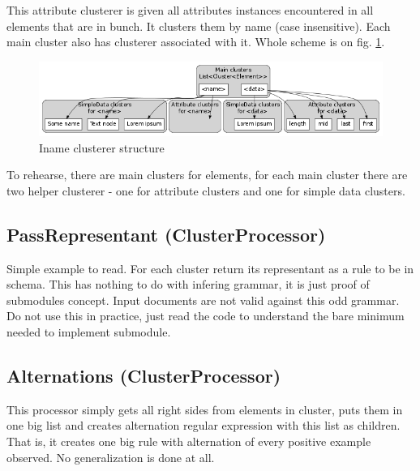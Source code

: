 \documentclass[a4paper,10pt,oneside]{article}
\newcommand{\code}[1]{\texttt{\StrSubstitute{#1}{.}{.\.}}}
\def\.{\discretionary{}{}{}}
\begin{document}
This attribute clusterer is given all attributes instances encountered in all elements that are in bunch.
It clusters them by name (case insensitive).
Each main cluster also has \code{SimpleData} clusterer associated with it.
Whole scheme is on fig. \ref{clusterer_structure}.
\begin{figure}[tpb]
	\centering\includegraphics[scale=1]{clusterer_structure}
	\caption{Iname clusterer structure} \label{clusterer_structure}
\end{figure}

To rehearse, there are main clusters for elements, for each main cluster there are two helper clusterer - one for attribute clusters and one for simple data clusters.

\subsection{PassRepresentant (ClusterProcessor)} \label{section_PassRepresentant}
Simple example to read. For each cluster return its representant as a rule to be in schema.
This has nothing to do with infering grammar, it is just proof of submodules concept.
Input documents are not valid against this odd grammar.
Do not use this in practice, just read the code to understand the bare minimum needed to implement submodule.

\subsection{Alternations (ClusterProcessor)} \label{section_Alternations}
This processor simply gets all right sides from elements in cluster, puts them in one big list and creates alternation regular expression with this list as children.
That is, it creates one big rule with alternation of every positive example observed.
No generalization is done at all.

\end{document}
